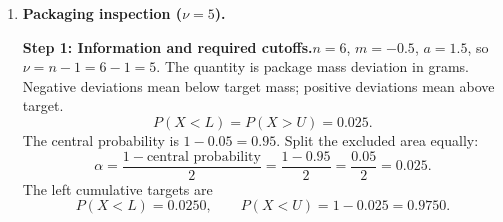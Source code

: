 \begin{enumerate}[leftmargin=*,label=\textbf{\arabic*.},itemsep=12pt,parsep=3pt,topsep=5pt]
\par\noindent\begin{minipage}{\linewidth}
\par\textbf{Step 7: Interpretation.}\nopagebreak\enspace The central $90\%$ limits are $(-59.36,79.36)$ kWh under $t$ and $(-55.60,75.60)$ kWh under normal, with approximately $5\%$ in each excluded tail. The lower endpoint is below forecast and the upper endpoint above it. The normal interval extends less far from the mean at both ends, by $3.76$ kWh per endpoint.
\end{minipage}\par
\item \begin{minipage}[t]{\linewidth}\textbf{Packaging inspection ($\nu=5$).}\nopagebreak
\par\textbf{Step 1: Information and required cutoffs.}\nopagebreak\enspace $n=6$, $m=-0.5$, $a=1.5$, so $\nu=n-1=6-1=5$. The quantity is package mass deviation in grams. Negative deviations mean below target mass; positive deviations mean above target.\[
P(X<L)=P(X>U)=0.025.
\]
The central probability is $1-0.05=0.95$. Split the excluded area equally:\[
\alpha=\frac{1-\text{central probability}}{2}=\frac{1-0.95}{2}=\frac{0.05}{2}=0.025.
\]
The left cumulative targets are\[
P(X<L)=0.0250,\qquad P(X<U)=1-0.025=0.9750.
\]


\end{minipage}
\end{enumerate}
